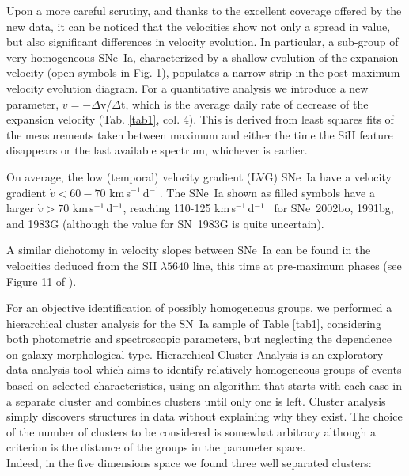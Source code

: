 \documentclass[preprint2]{aastex}
\newcommand{\kmsd}{km\,s$^{-1}$\,d$^{-1}$}
\begin{document}
Upon a more careful scrutiny, and thanks to the excellent coverage
offered by the new data, it can be noticed that the velocities show
not only a spread in value, but also significant differences in
velocity evolution.  In particular, a sub-group of very homogeneous
SNe~Ia, characterized by a shallow evolution of the expansion velocity
(open symbols in Fig. 1), populates a narrow strip in the post-maximum
velocity evolution diagram.  For a quantitative analysis we introduce
a new parameter, $\dot{v} = -\Delta$v/$\Delta$t, which is the average
daily rate of decrease of the expansion velocity (Tab. \ref{tab1}, col. 4). 
This is derived from least squares fits of the measurements taken between 
maximum and either the time the SiII feature disappears or the last 
available spectrum, whichever is earlier.

On average, the low (temporal) velocity gradient (LVG) SNe~Ia have a
velocity gradient $\dot{v} < 60-70$ \kmsd.  The SNe~Ia shown as filled
symbols have a larger $\dot{v} > 70$ \kmsd, reaching 110-125 \kmsd~
for SNe~2002bo, 1991bg, and 1983G (although the value for SN~1983G is
quite uncertain).

A similar dichotomy in velocity slopes between SNe~Ia can be found in the
velocities deduced from the SII $\lambda 5640$ line, this time at pre-maximum
phases (see Figure 11 of \citet{ben04}).

For an objective identification of possibly homogeneous groups, we
performed a hierarchical cluster analysis for the SN~Ia sample of
Table \ref{tab1}, considering both photometric and spectroscopic
parameters, but neglecting the dependence on galaxy morphological
type. Hierarchical Cluster Analysis \citep{and73} is an
exploratory data analysis tool which aims to identify relatively
homogeneous groups of events based on selected characteristics, using
an algorithm that starts with each case in a separate cluster and
combines clusters until only one is left.  Cluster analysis simply
discovers structures in data without explaining why they exist. The
choice of the number of clusters to be considered is somewhat
arbitrary although a criterion is the distance of the groups in the
parameter space.\\ 
Indeed, in the five dimensions space we found three well separated
clusters:
\end{document}
